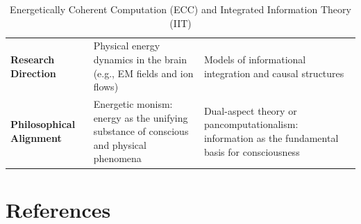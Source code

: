 \begin{refsection}
\begin{table}[h!]
\begin{tabularx}{\textwidth}{@{}p{3cm}Xp{4cm}@{}}
      \textbf{Research Direction}         & Physical energy dynamics in the brain (e.g., EM fields and ion flows)                                              & Models of informational integration and causal structures                                              \\
      \textbf{Philosophical Alignment}    & Energetic monism: energy as the unifying substance of conscious and physical phenomena                             & Dual-aspect theory or pancomputationalism: information as the fundamental basis for consciousness      \\ \bottomrule
    \end{tabularx}
    \caption{Energetically Coherent Computation (ECC) and Integrated Information Theory (IIT)}
    \label{tab:ecc_vs_iit}
  \end{table}

  

  

  

  

  

  

  

  

  

  

  

  \newpage
  \section{References}
  \printbibliography[title={},heading=subbibliography]
\end{refsection}
